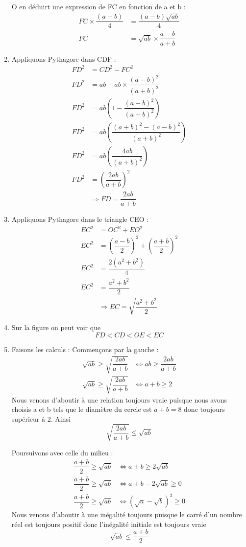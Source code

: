 \documentclass[11pt]{article}
\begin{document}
\begin{enumerate}
O en déduirt une expression de FC en fonction de a et b :
\begin{align*}
	FC\times \dfrac{(a + b)}{4} &= \dfrac{(a - b)\sqrt{ab}}{4}\\
	FC &= \sqrt{ab}\times\dfrac{a - b}{a + b}
\end{align*}
\item Appliquons Pythagore dans CDF : 
\begin{align*}
	FD^2 &= CD^2 - FC^2\\
	FD^2 &= ab - ab \times\dfrac{(a - b)^2}{(a + b)^2} \\
	FD^2 &= ab\left( 1 - \dfrac{(a - b)^2}{(a + b)^2}\right) \\
	FD^2 &= ab\left( \dfrac{(a + b)^2 - (a - b)^2}{(a + b)^2}\right) \\
	FD^2 &= ab\left( \dfrac{4ab}{(a + b)^2}\right) \\
	FD^2 &= \left(\dfrac{2ab}{a + b}\right)^2\\
	 &\Rightarrow \boxed{FD = \dfrac{2ab}{a + b}}
\end{align*}
\item Appliquons Pythagore dans le triangle CEO :
\begin{align*}
	EC^2 &= OC^2 + EO^2 \\
	EC^2 &= \left(\dfrac{a - b}{2}\right)^2 + \left(\dfrac{a + b}{2}\right)^2 \\
	EC^2 &= \dfrac{2(a^2 + b^2)}{4} \\
	EC^2 &= \dfrac{a^2 + b^2}{2} \\
	&\Rightarrow \boxed{EC = \sqrt{\dfrac{a^2 + b^2}{2}}}
\end{align*}
\item Sur la figure on peut voir que \[FD < CD < OE < EC\]
\item Faisons les calculs :
Commençons par la gauche : 
\begin{align*}
	\sqrt{ab} \geq \sqrt{\dfrac{2ab}{a + b}} &\iff ab \geq  \dfrac{2ab}{a + b} \\
	\sqrt{ab} \geq \sqrt{\dfrac{2ab}{a + b}} &\iff a + b \geq  2 
\end{align*}
Nous venons d'aboutir à une relation toujours vraie puisque nous avons choisis a et b tels que le diamètre du cercle est \(a + b = 8\) donc toujours supérieur à 2. Ainsi 
\[\boxed{\sqrt{\dfrac{2ab}{a + b}} \leq \sqrt{ab}}\]

Poursuivons avec celle du milieu : 
\begin{align*}
	\dfrac{a + b}{2} \geq \sqrt{ab} &\iff a + b \geq 2\sqrt{ab}\\
	\dfrac{a + b}{2} \geq \sqrt{ab} &\iff a + b - 2\sqrt{ab} \geq 0\\
	\dfrac{a + b}{2} \geq \sqrt{ab} &\iff (\sqrt{a} - \sqrt{b})^2 \geq 0
\end{align*}
Nous venons d'aboutir à une inégalité toujours puisque le carré d'un nombre réel est toujours positif donc l'inégalité initiale est toujours vraie \[\boxed{\sqrt{ab} \leq \dfrac{a+b}{2}}\]


\end{enumerate}
\end{document}
